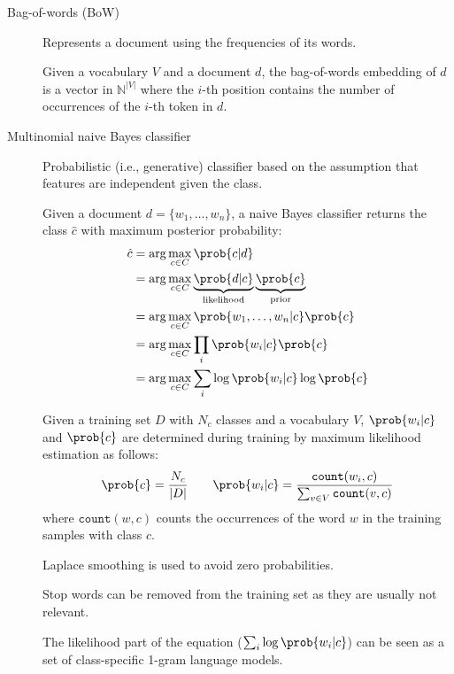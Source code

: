 \begin{description}
    \item[Bag-of-words (BoW)] 
        Represents a document using the frequencies of its words.

        Given a vocabulary $V$ and a document $d$, the bag-of-words embedding of $d$ is a vector in $\mathbb{N}^{\vert V \vert}$ where the $i$-th position contains the number of occurrences of the $i$-th token in $d$.

    \item[Multinomial naive Bayes classifier] 
        Probabilistic (i.e., generative) classifier based on the assumption that features are independent given the class.

        Given a document $d = \{ w_1, \dots, w_n \}$, a naive Bayes classifier returns the class $\hat{c}$ with maximum posterior probability:
        \[
            \begin{split}
                \hat{c} &= \arg\max_{c \in C} \prob{c | d} \\
                &= \arg\max_{c \in C} \underbrace{\prob{d | c}}_{\text{likelihood}} \underbrace{\prob{c}}_{\text{prior}} \\
                &= \arg\max_{c \in C} \prob{w_1, \dots, w_n | c} \prob{c} \\
                &= \arg\max_{c \in C} \prod_{i} \prob{w_i | c} \prob{c} \\
                &= \arg\max_{c \in C} \sum_{i} \log\prob{w_i | c} \log\prob{c} \\
            \end{split}
        \]

        Given a training set $D$ with $N_c$ classes and a vocabulary $V$, $\prob{w_i | c}$ and $\prob{c}$ are determined during training by maximum likelihood estimation as follows:
        \[
            \prob{c} = \frac{N_c}{\vert D \vert}
            \qquad
            \prob{w_i | c} = \frac{\texttt{count}(w_i, c)}{\sum_{v \in V} \texttt{count}(v, c)}
        \]
        where $\texttt{count}(w, c)$ counts the occurrences of the word $w$ in the training samples with class $c$.

        \begin{remark}
            Laplace smoothing is used to avoid zero probabilities.
        \end{remark}

        \begin{remark}
            Stop words can be removed from the training set as they are usually not relevant.
        \end{remark}

        \begin{remark}
            The likelihood part of the equation ($\sum_{i} \log\prob{w_i | c}$) can be seen as a set of class-specific 1-gram language models.
        \end{remark}
\end{description}

